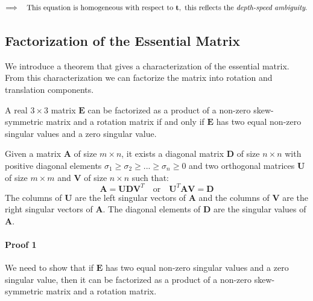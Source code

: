 \documentclass[11pt,a4paper]{article}
\theoremstyle{definition}
\theoremstyle{plain}
\theoremstyle{remark}
\begin{document}
\[
    \Longrightarrow \quad \text{This equation is homogeneous with respect to } \mathbf{t}, \text{ this reflects the \emph{depth-speed ambiguity}.}
\]

\subsection{Factorization of the Essential Matrix}\label{subsec:factorization_essential}

We introduce a theorem that gives a characterization of the essential matrix.
From this characterization we can factorize the matrix into rotation and translation components.

\begin{tcolorbox}[colback=purple!5!white,colframe=purple!75!black,title=Factorization Theorem]
A real $3 \times 3$ matrix $\mathbf{E}$ can be factorized as a product of a non-zero skew-symmetric
matrix and a rotation matrix if and only if $\mathbf{E}$ has two equal non-zero singular values
and a zero singular value.
\end{tcolorbox}

\begin{tcolorbox}[colback=green!5!white,colframe=green!75!black,title=Singular Value Decomposition]
Given a matrix $\mathbf{A}$ of size $m \times n$, it exists a diagonal matrix
$\mathbf{D}$ of size $n \times n$ with positive diagonal elements
$\sigma_1 \geq \sigma_2 \geq ... \geq \sigma_n \geq 0$ and two orthogonal matrices $\mathbf{U}$ of size $m \times m$
and $\mathbf{V}$ of size $n \times n$ such that:
\[
\mathbf{A} = \mathbf{U} \mathbf{D} \mathbf{V}^T \quad \text{or} \quad \mathbf{U}^T \mathbf{A} \mathbf{V} = \mathbf{D}
\]
The columns of $\mathbf{U}$ are the left singular vectors of $\mathbf{A}$ and the columns of $\mathbf{V}$
are the right singular vectors of $\mathbf{A}$. The diagonal elements of $\mathbf{D}$ are the singular values of $\mathbf{A}$.

\end{tcolorbox}
\paragraph{Proof 1}
We need to show that if $\mathbf{E}$ has two equal non-zero singular values and a zero singular value,
 then it can be factorized as a product of a non-zero skew-symmetric matrix and a rotation matrix.
\end{document}
